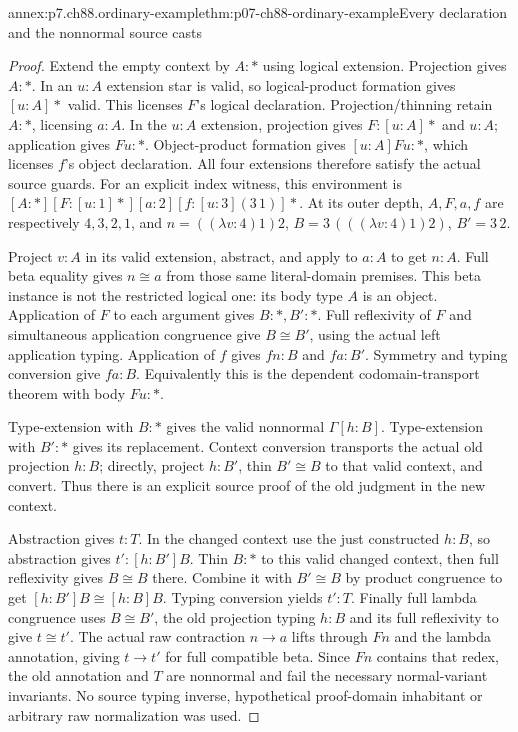 \begin{annexitem}{annex:p7.ch88.ordinary-example}{thm:p07-ch88-ordinary-example}{Every declaration and the nonnormal source casts}
\begin{proof}
Extend the empty context by \(A:\ast\) using logical extension.
Projection gives \(A:\ast\). In an \(u:A\) extension star is
valid, so logical-product formation gives \([u:A]\ast\) valid.
This licenses \(F\)'s logical declaration. Projection/thinning
retain \(A:\ast\), licensing \(a:A\). In the \(u:A\) extension,
projection gives \(F:[u:A]\ast\) and \(u:A\); application gives
\(Fu:\ast\). Object-product formation gives
\([u:A]Fu:\ast\), which licenses \(f\)'s object declaration.
All four extensions therefore satisfy the actual source guards.
For an explicit index witness, this environment is
\([A:\ast][F:[u:1]\ast][a:2][f:[u:3](3\,1)]\ast\).
At its outer depth, \(A,F,a,f\) are respectively \(4,3,2,1\),
and \(n=((\lambda v:4)1)2\),
\(B=3\,(((\lambda v:4)1)2)\), \(B'=3\,2\).

Project \(v:A\) in its valid extension, abstract, and apply to
\(a:A\) to get \(n:A\). Full beta equality gives \(n\cong a\)
from those same literal-domain premises. This beta instance is not
the restricted logical one: its body type \(A\) is an object.
Application of \(F\) to each argument gives \(B:\ast,B':\ast\).
Full reflexivity of \(F\) and simultaneous application congruence
give \(B\cong B'\), using the actual left application typing.
Application of \(f\) gives \(fn:B\) and \(fa:B'\). Symmetry
and typing conversion give \(fa:B\). Equivalently this is the
dependent codomain-transport theorem with body \(Fu:\ast\).

Type-extension with \(B:\ast\) gives the valid nonnormal
\(\Gamma[h:B]\). Type-extension with \(B':\ast\) gives its
replacement. Context conversion transports the actual old projection
\(h:B\); directly, project \(h:B'\), thin \(B'\cong B\) to
that valid context, and convert. Thus there is an explicit source
proof of the old judgment in the new context.

Abstraction gives \(t:T\). In the changed context use the just
constructed \(h:B\), so abstraction gives
\(t':[h:B']B\). Thin \(B:\ast\) to this valid changed context,
then full reflexivity gives \(B\cong B\) there. Combine it with
\(B'\cong B\) by product congruence to get
\([h:B']B\cong[h:B]B\). Typing conversion yields \(t':T\).
Finally full lambda congruence uses \(B\cong B'\), the old
projection typing \(h:B\) and its full reflexivity to give
\(t\cong t'\). The actual raw contraction \(n\to a\) lifts
through \(Fn\) and the lambda annotation, giving \(t\to t'\)
for full compatible beta. Since \(Fn\) contains that redex, the
old annotation and \(T\) are nonnormal and fail the necessary
normal-variant invariants. No source typing inverse, hypothetical
proof-domain inhabitant or arbitrary raw normalization was used.
\end{proof}
\end{annexitem}
